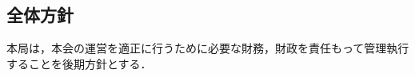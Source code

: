\documentclass[a4paper,10pt]{jarticle}
\begin{document}
\subsection*{全体方針}

本局は，本会の運営を適正に行うために必要な財務，財政を責任もって管理執行することを後期方針とする．
\end{document}
